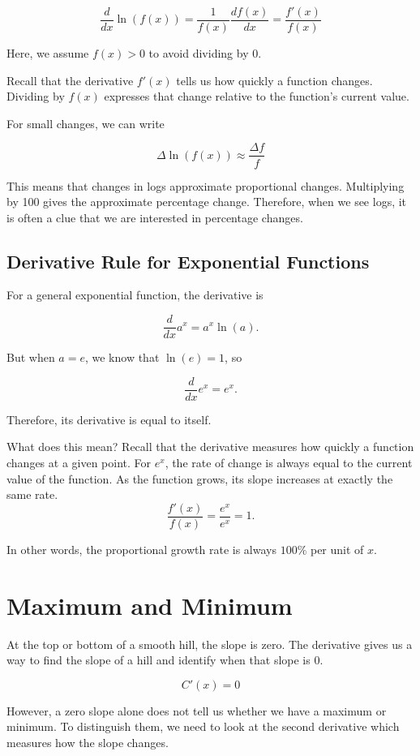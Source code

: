 \documentclass[12pt]{article}
\begin{document}
\[
    \frac{d}{dx}\ln(f(x))
    = \frac{1}{f(x)}\frac{df(x)}{dx} = \frac{f'(x)}{f(x)}
\]

Here, we assume $f(x)>0$ to avoid dividing by 0.

Recall that the derivative $f'(x)$ tells us how
quickly a function changes. Dividing by $f(x)$
expresses that change relative to the
function's current value.

For small changes, we can write

\[
\Delta\ln(f(x))
\approx
\frac{\Delta f}{f}
\]

This means that changes in logs approximate
proportional changes. Multiplying by 100
gives the approximate percentage change. Therefore, when we see logs, it is often a clue that we are interested in percentage changes.

\subsection{Derivative Rule for Exponential Functions}

For a general exponential function, the derivative is

\[
\frac{d}{dx}a^x=a^x\ln(a).
\]

But when $a=e$, we know that $\ln(e)=1$, so

\[
\frac{d}{dx}e^x=e^x.
\]

Therefore, its derivative is equal to itself.

What does this mean? Recall that the derivative measures
how quickly a function changes at a given point.
For $e^x$, the rate of change is always equal to the
current value of the function. As the function grows, its slope increases at exactly the same rate. 
\[
\frac{f'(x)}{f(x)}
=
\frac{e^x}{e^x}
=1.
\]

In other words, the proportional growth
rate is always $100\%$ per unit of $x$.






\section{Maximum and Minimum}

At the top or bottom of a smooth hill, the slope is zero. The derivative gives us a way to find the slope of a hill and identify when that slope is 0.

\[
C'(x) = 0
\]

However, a zero slope alone does not tell us whether
we have a maximum or minimum. To distinguish them,
we need to look at the second derivative which
measures how the slope changes.
\end{document}
